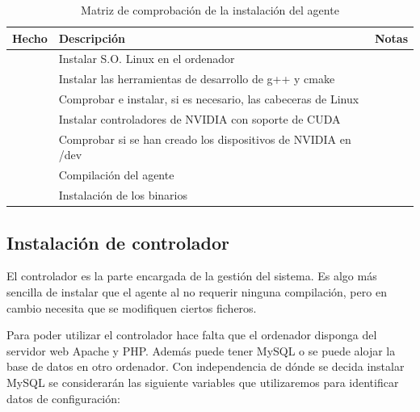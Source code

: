 \begin{table}
	\centering
	
	\begin{tabular}{|c|p{5.6cm}|p{5.6cm}|}
	\hline
	Hecho & Descripción & Notas\\
	\hline
	& Instalar S.O. Linux en el ordenador & \\
	\hline
	& Instalar las herramientas de desarrollo de g++ y cmake & \\
	\hline
	& Comprobar e instalar, si es necesario, las cabeceras de Linux & \\
	\hline
	& Instalar controladores de NVIDIA con soporte de CUDA & \\
	\hline
	& Comprobar si se han creado los dispositivos de NVIDIA en /dev & \\
	\hline
	& Compilación del agente & \\
	\hline
	& Instalación de los binarios &\\
	\hline
	\end{tabular}
	
	\caption{Matriz de comprobación de la instalación del agente}\label{tab:mat_agente}
\end{table}

\subsection{Instalación de controlador}

El controlador es la parte encargada de la gestión del sistema. Es algo más sencilla de instalar que el agente al no requerir ninguna compilación, pero en cambio necesita que se modifiquen ciertos ficheros.

Para poder utilizar el controlador hace falta que el ordenador disponga del servidor web Apache y PHP. Además puede tener MySQL o se puede alojar la base de datos en otro ordenador. Con independencia de dónde se decida instalar MySQL se considerarán las siguiente variables que utilizaremos para identificar datos de configuración:


